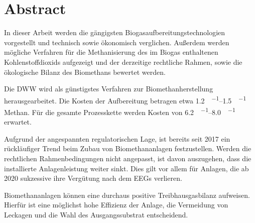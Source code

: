 
\section*{Abstract}

\forceindent In dieser Arbeit werden die gängigsten Biogasaufbereitungstechnologien vorgestellt und technisch sowie ökonomisch verglichen. Außerdem werden mögliche Verfahren für die Methanisierung des im Biogas enthaltenen Kohlenstoffdioxids aufgezeigt und der derzeitige rechtliche Rahmen, sowie die ökologische Bilanz des Biomethans bewertet werden. \smallskip

\forceindent Die \gls{DWW} wird als günstigstes Verfahren zur Biomethanherstellung herausgearbeitet. Die Kosten der Aufbereitung betragen etwa \SIrange{1,2}{1,5}{\ct\per\kwh} Methan. Für die gesamte Prozesskette werden Kosten von \SIrange{6,2}{8,0}{\ct\per\kwh} erwartet. \smallskip

\forceindent Aufgrund der angespannten regulatorischen Lage, ist bereits seit \SI{2017}{\relax} ein rückläufiger Trend beim Zubau von Biomethananlagen festzustellen. Werden die rechtlichen Rahmenbedingungen nicht angepasst, ist davon auszugehen, dass die installierte Anlagenleistung weiter sinkt. Dies gilt vor allem für Anlagen, die ab \SI{2020}{\relax} sukzessive ihre Vergütung nach dem \glspl{EEG} verlieren.\smallskip

\forceindent Biomethananlagen können eine durchaus positive Treibhausgasbilanz aufweisen. Hierfür ist eine möglichst hohe Effizienz der Anlage, die Vermeidung von Leckagen und die Wahl des Ausgangssubstrat entscheidend.